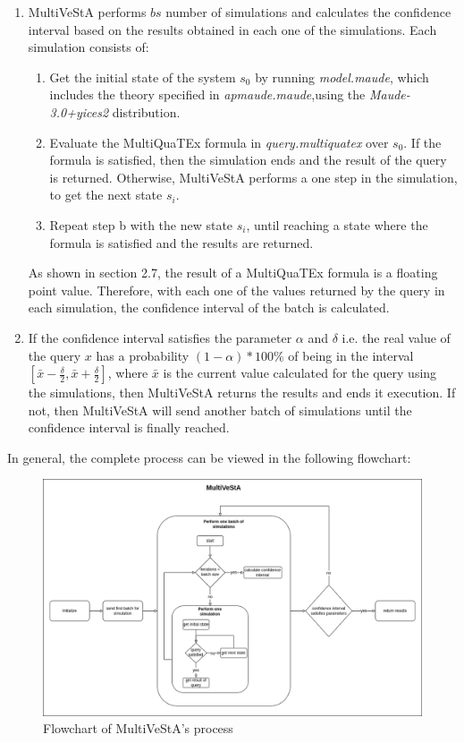 \begin{enumerate}
    \item MultiVeStA performs $bs$ number of simulations and calculates the confidence interval based on the results obtained in each one of the simulations. Each simulation consists of:
        \begin{enumerate}
            \item Get the initial state of the system $s_0$ by running \textit{model.maude}, which includes the theory specified in \textit{apmaude.maude},using the \textit{Maude-3.0+yices2} distribution.
            \item Evaluate the MultiQuaTEx formula in \textit{query.multiquatex} over $s_0$. If the formula is satisfied, then the simulation ends and the result of the query is returned. Otherwise, MultiVeStA performs  a one step in the simulation, to get the next state $s_i$.
            \item Repeat step b with the new state $s_i$, until reaching a state where the formula is satisfied and the results are returned. 
        \end{enumerate}
    As shown in section 2.7, the result of a MultiQuaTEx formula is a floating point value. Therefore, with each one of the values returned by the query in each simulation, the confidence interval of the batch is calculated.
    
    \item If the confidence interval satisfies the parameter $\alpha$ and $\delta$ i.e. the real value of the query $x$ has a probability $(1-\alpha)*100\%$ of being in the interval $[\bar{x} - \frac{\delta}{2},\bar{x} + \frac{\delta}{2}]$, where $\bar{x}$ is the current value calculated for the query using the simulations, then MultiVeStA returns the results and ends it execution. If not, then MultiVeStA will send another batch of simulations until the confidence interval is finally reached.
\end{enumerate}
In general, the complete process can be viewed in the following flowchart:
\begin{figure}[H]
    \centering
    \includegraphics[scale = 0.4]{images/multi3.png}
    \caption{Flowchart of MultiVeStA's process}
    \label{fig:multi3}
\end{figure}

